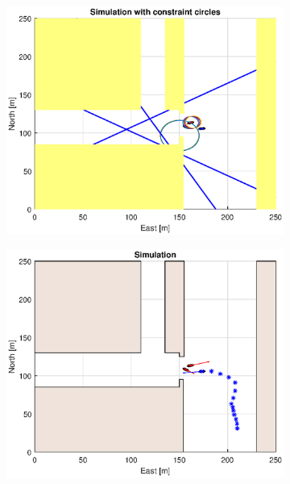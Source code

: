 \begin{figure}[ht]\ContinuedFloat
    \begin{subfigure}[b]{0.49\textwidth}
        \centering
        \includegraphics[width=\textwidth]{Images/Figures/Havn1/Simple0_f1_Frame4}
    \end{subfigure}
    \hfill
    \begin{subfigure}[b]{0.499\textwidth}
        \centering
        \includegraphics[width=\textwidth]{Images/Figures/Havn1/Simple0_f600_Frame4}
    \end{subfigure}

\end{figure}
